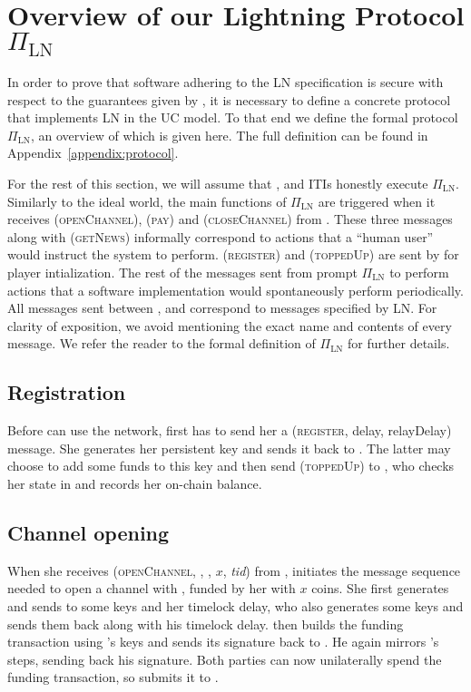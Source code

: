 \section{Overview of our Lightning Protocol $\Pi_{\mathrm{LN}}$}
  In order to prove that software adhering to the LN specification is secure
  with respect to the guarantees given by \fpaynet, it is necessary to define a
  concrete protocol that implements LN in the UC model. To that end we define
  the formal protocol $\Pi_{\mathrm{LN}}$, an overview of which is given here.
  The full definition can be found in Appendix~\ref{appendix:protocol}.

  For the rest of this section, we will assume that \alice, \bob{} and
  \charlie{} ITIs honestly execute $\Pi_{\mathrm{LN}}$. Similarly to the ideal
  world, the main functions of $\Pi_{\mathrm{LN}}$ are triggered when it
  receives (\textsc{openChannel}), (\textsc{pay}) and (\textsc{closeChannel})
  from \environment{}. These three messages along with (\textsc{getNews})
  informally correspond to actions that a ``human user'' would instruct the
  system to perform. (\textsc{register}) and (\textsc{toppedUp}) are sent by
  \environment{} for player intialization. The rest of the messages sent from
  \environment{} prompt $\Pi_{\mathrm{LN}}$ to perform actions that a software
  implementation would spontaneously perform periodically. All messages sent
  between \alice, \bob{} and \charlie{} correspond to messages specified by LN.
  For clarity of exposition, we avoid mentioning the exact name and contents of
  every message. We refer the reader to the formal definition of
  $\Pi_{\mathrm{LN}}$ for further details.

  \subsection{Registration}
    Before \alice{} can use the network, \environment{} first has to send her a
    (\textsc{register}, delay, relayDelay) message. She generates her
    persistent key and sends it back to \environment{}. The latter may choose to
    add some funds to this key and then send (\textsc{toppedUp}) to \alice, who
    checks her state in \ledger{} and records her on-chain balance.

  \subsection{Channel opening}
    When she receives (\textsc{openChannel}, \alice, \bob, $x$, \textit{tid})
    from \environment, \alice{} initiates the message sequence needed to open a
    channel with \bob, funded by her with $x$ coins. She first generates and
    sends to \bob{} some keys and her timelock delay, who also generates some
    keys and sends them back along with his timelock delay. \alice{} then builds
    the funding transaction using \bob's keys and sends its signature back to
    \bob. He again mirrors \alice's steps, sending back his signature. Both
    parties can now unilaterally spend the funding transaction, so \alice{}
    submits it to \ledger.

